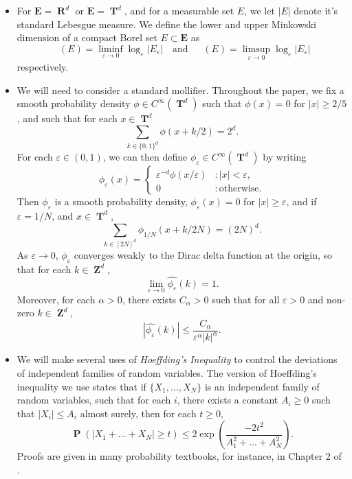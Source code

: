 \documentclass[12pt,reqno]{article}
\numberwithin{equation}{section}
\DeclareMathOperator{\lowminkdim}{\underline{\dim}_{\mathbf{M}}}
\DeclareMathOperator{\upminkdim}{\overline{\dim}_{\mathbf{M}}}
\DeclareMathOperator{\RR}{\mathbf{R}}
\DeclareMathOperator{\ZZ}{\mathbf{Z}}
\DeclareMathOperator{\TT}{\mathbf{T}}
\DeclareMathOperator{\PP}{\mathbf{P}}
\begin{document}
\begin{itemize}
    \item For $\mathbf{E} = \RR^d$ or $\mathbf{E} = \TT^d$, and for a measurable set $E$, we let $|E|$ denote it's standard Lebesgue measure. We define the lower and upper Minkowski dimension of a compact Borel set $E \subset \mathbf{E}$ as
    \[ \lowminkdim(E) = \liminf_{\varepsilon \to 0} \log_\varepsilon|E_\varepsilon| \quad\text{and}\quad \upminkdim(E) = \limsup_{\varepsilon \to 0} \log_\varepsilon |E_\varepsilon| \]
    respectively.

    \item We will need to consider a standard mollifier. Throughout the paper, we fix a smooth probability density $\phi \in C^\infty(\TT^d)$ such that $\phi(x) = 0$ for $|x| \geq 2/5$, and such that for each $x \in \TT^d$
    \[ \sum_{k \in \{ 0, 1 \}^d} \phi(x + k/2) = 2^d. \]
    For each $\varepsilon \in (0,1)$, we can then define $\phi_\varepsilon \in C^\infty(\TT^d)$ by writing
    \[ \phi_\varepsilon(x) = \begin{cases} \varepsilon^{-d} \phi(x/\varepsilon) &: |x| < \varepsilon, \\ 0 &: \text{otherwise}. \end{cases} \]
    Then $\phi_\varepsilon$ is a smooth probability density, $\phi_\varepsilon(x) = 0$ for $|x| \geq \varepsilon$, and if $\varepsilon = 1/N$, and $x \in \TT^d$,
    \begin{equation} \label{equation5550002352124124512}
        \sum_{k \in [2N]^d} \phi_{1/N}(x + k/2N) = (2N)^d.
    \end{equation}
    As $\varepsilon \to 0$, $\phi_\varepsilon$ converges weakly to the Dirac delta function at the origin, so that for each $k \in \ZZ^d$,
    \begin{equation} \label{approximationtoidentitypointwiseconvergence}
        \lim_{\varepsilon \to 0} \widehat{\phi_\varepsilon}(k) = 1.
    \end{equation}
    Moreover, for each $\alpha > 0$, there exists $C_\alpha > 0$ such that for all $\varepsilon > 0$ and non-zero $k \in \ZZ^d$,
    \begin{equation} \label{molificationdecaybound}
        |\widehat{\phi_\varepsilon}(k)| \leq \frac{C_\alpha}{\varepsilon^\alpha |k|^\alpha}.
    \end{equation}

    \item We will make several uses of \emph{Hoeffding's Inequality} to control the deviations of independent families of random variables. The version of Hoeffding's inequality we use states that if $\{ X_1, \dots, X_N \}$ is an independent family of random variables, such that for each $i$, there exists a constant $A_i \geq 0$ such that $|X_i| \leq A_i$ almost surely, then for each $t \geq 0$,
    \[ \PP \left( |X_1 + \dots + X_N| \geq t \right) \leq 2 \exp \left(\frac{-2t^2}{A_1^2 + \dots + A_N^2} \right). \]
    Proofs are given in many probability textbooks, for instance, in Chapter 2 of \cite{Vershynin}.


\end{itemize}
\end{document}
